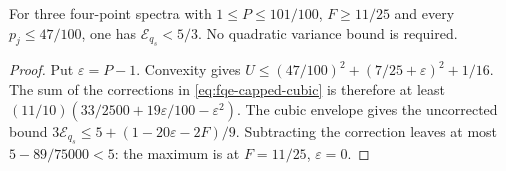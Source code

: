 \begin{corollary}
\label{cor:fqe-capped-cluster}
For three four-point spectra with $1\le P\le101/100$, $F\ge11/25$ and every
$p_j\le47/100$, one has $\mathcal E_{q_s}<5/3$.
No quadratic variance bound is required.
\end{corollary}
\begin{proof}
Put $\varepsilon=P-1$. Convexity gives
$U\le(47/100)^2+(7/25+\varepsilon)^2+1/16$.
The sum of the corrections in \eqref{eq:fqe-capped-cubic} is therefore at least
$(11/10)(33/2500+19\varepsilon/100-\varepsilon^2)$.
The cubic envelope gives the uncorrected bound
$3\mathcal E_{q_s}\le5+(1-20\varepsilon-2F)/9$.
Subtracting the correction leaves at most $5-89/75000<5$:
the maximum is at $F=11/25$, $\varepsilon=0$.
\end{proof}
